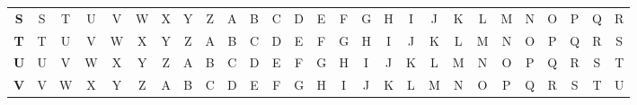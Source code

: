 \documentclass{article}
\begin{document}
\begin{latin}
\begin{table}[H]
{\begin{tabular}{ccccccccccccccccccccccccccc}
\multicolumn{1}{c|}{\textbf{S}} & \multicolumn{1}{c|}{S} & \multicolumn{1}{c|}{T} & \multicolumn{1}{c|}{U} & \multicolumn{1}{c|}{V} & \multicolumn{1}{c|}{W} & \multicolumn{1}{c|}{X} & \multicolumn{1}{c|}{Y} & \multicolumn{1}{c|}{Z} & \multicolumn{1}{c|}{A} & \multicolumn{1}{c|}{B} & \multicolumn{1}{c|}{C} & \multicolumn{1}{c|}{D} & \multicolumn{1}{c|}{E} & \multicolumn{1}{c|}{F} & \multicolumn{1}{c|}{G} & \multicolumn{1}{c|}{H} & \multicolumn{1}{c|}{I} & \multicolumn{1}{c|}{J} & \multicolumn{1}{c|}{K} & \multicolumn{1}{c|}{L} & \multicolumn{1}{c|}{M} & \multicolumn{1}{c|}{N} & \multicolumn{1}{c|}{O} & \multicolumn{1}{c|}{P} & \multicolumn{1}{c|}{Q} & \multicolumn{1}{c|}{R} \\ \cline{2-27} 
\multicolumn{1}{c|}{\textbf{T}} & \multicolumn{1}{c|}{T} & \multicolumn{1}{c|}{U} & \multicolumn{1}{c|}{V} & \multicolumn{1}{c|}{W} & \multicolumn{1}{c|}{X} & \multicolumn{1}{c|}{Y} & \multicolumn{1}{c|}{Z} & \multicolumn{1}{c|}{A} & \multicolumn{1}{c|}{B} & \multicolumn{1}{c|}{C} & \multicolumn{1}{c|}{D} & \multicolumn{1}{c|}{E} & \multicolumn{1}{c|}{F} & \multicolumn{1}{c|}{G} & \multicolumn{1}{c|}{H} & \multicolumn{1}{c|}{I} & \multicolumn{1}{c|}{J} & \multicolumn{1}{c|}{K} & \multicolumn{1}{c|}{L} & \multicolumn{1}{c|}{M} & \multicolumn{1}{c|}{N} & \multicolumn{1}{c|}{O} & \multicolumn{1}{c|}{P} & \multicolumn{1}{c|}{Q} & \multicolumn{1}{c|}{R} & \multicolumn{1}{c|}{S} \\ \cline{2-27} 
\multicolumn{1}{c|}{\textbf{U}} & \multicolumn{1}{c|}{U} & \multicolumn{1}{c|}{V} & \multicolumn{1}{c|}{W} & \multicolumn{1}{c|}{X} & \multicolumn{1}{c|}{Y} & \multicolumn{1}{c|}{Z} & \multicolumn{1}{c|}{A} & \multicolumn{1}{c|}{B} & \multicolumn{1}{c|}{C} & \multicolumn{1}{c|}{D} & \multicolumn{1}{c|}{E} & \multicolumn{1}{c|}{F} & \multicolumn{1}{c|}{G} & \multicolumn{1}{c|}{H} & \multicolumn{1}{c|}{I} & \multicolumn{1}{c|}{J} & \multicolumn{1}{c|}{K} & \multicolumn{1}{c|}{L} & \multicolumn{1}{c|}{M} & \multicolumn{1}{c|}{N} & \multicolumn{1}{c|}{O} & \multicolumn{1}{c|}{P} & \multicolumn{1}{c|}{Q} & \multicolumn{1}{c|}{R} & \multicolumn{1}{c|}{S} & \multicolumn{1}{c|}{T} \\ \cline{2-27} 
\multicolumn{1}{c|}{\textbf{V}} & \multicolumn{1}{c|}{V} & \multicolumn{1}{c|}{W} & \multicolumn{1}{c|}{X} & \multicolumn{1}{c|}{Y} & \multicolumn{1}{c|}{Z} & \multicolumn{1}{c|}{A} & \multicolumn{1}{c|}{B} & \multicolumn{1}{c|}{C} & \multicolumn{1}{c|}{D} & \multicolumn{1}{c|}{E} & \multicolumn{1}{c|}{F} & \multicolumn{1}{c|}{G} & \multicolumn{1}{c|}{H} & \multicolumn{1}{c|}{I} & \multicolumn{1}{c|}{J} & \multicolumn{1}{c|}{K} & \multicolumn{1}{c|}{L} & \multicolumn{1}{c|}{M} & \multicolumn{1}{c|}{N} & \multicolumn{1}{c|}{O} & \multicolumn{1}{c|}{P} & \multicolumn{1}{c|}{Q} & \multicolumn{1}{c|}{R} & \multicolumn{1}{c|}{S} & \multicolumn{1}{c|}{T} & \multicolumn{1}{c|}{U} \\ \cline{2-27} 

\end{tabular}}
\end{table}
\end{latin}
\end{document}
